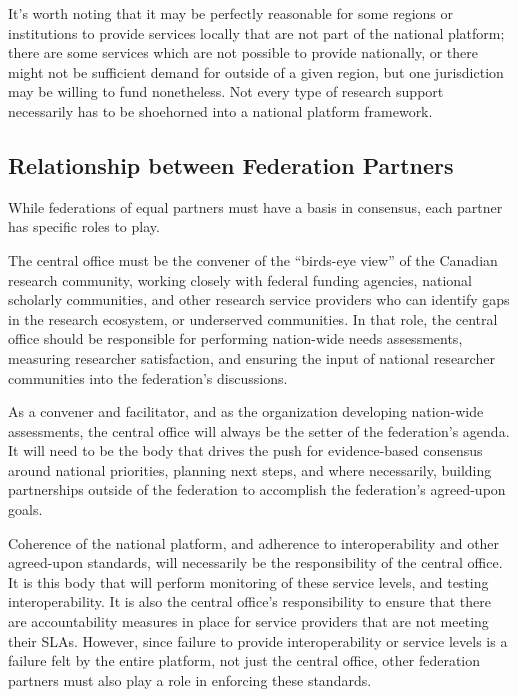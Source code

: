 \documentclass[11pt, letterpaper, twoside]{article}
\begin{document}
It's worth noting that it may be perfectly reasonable for some regions
or institutions to provide services locally that are not part of the
national platform; there are some services which are not possible to
provide nationally, or there might not be sufficient demand for outside
of a given region, but one jurisdiction may be willing to fund
nonetheless. Not every type of research support necessarily has to be
shoehorned into a national platform framework.

\subsection*{Relationship between Federation Partners}
%

While federations of equal partners must have a basis in consensus, each
partner has specific roles to play.


The central office must be the convener of the ``birds-eye view'' of the
Canadian research community, working closely with federal funding
agencies, national scholarly communities, and other research service
providers who can identify gaps in the research ecosystem, or
underserved communities.  In that role, the central office should be
responsible for performing nation-wide needs assessments, measuring
researcher satisfaction, and ensuring the input of national researcher
communities into the federation's discussions.


As a convener and facilitator, and as the organization developing
nation-wide assessments, the central office will always be the setter of
the federation's agenda.  It will need to be the body that drives the
push for evidence-based consensus around national priorities, planning
next steps, and where necessarily, building partnerships outside of the
federation to accomplish the federation's agreed-upon goals.


Coherence of the national platform, and adherence to interoperability
and other agreed-upon standards, will necessarily be the responsibility
of the central office. It is this body that will perform monitoring of
these service levels, and testing interoperability. It is also the
central office's responsibility to ensure that there are accountability
measures in place for service providers that are not meeting their SLAs.
However, since failure to provide interoperability or service levels is
a failure felt by the entire platform, not just the central office,
other federation partners must also play a role in enforcing these
standards.
\end{document}
